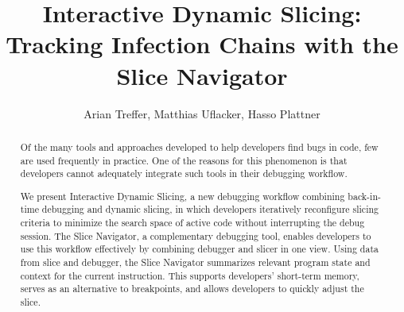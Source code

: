 \documentclass[
			english,
			review,
			]{elsarticle}
\begin{document}
\begin{frontmatter}

\title{Interactive Dynamic Slicing: Tracking Infection Chains with the Slice Navigator}

\author{Arian Treffer, Matthias Uflacker, Hasso Plattner}
\address{Hasso Plattner Institute, Potsdam, Germany}


\begin{abstract}
%
%
Of the many tools and approaches developed to help developers find bugs in code, few are used frequently in practice.
One of the reasons for this phenomenon is that developers cannot adequately integrate such tools in their debugging workflow.

We present Interactive Dynamic Slicing, a new debugging workflow combining back-in-time debugging and dynamic slicing, in which developers iteratively reconfigure slicing criteria to minimize the search space of active code without interrupting the debug session.
The Slice Navigator, a complementary debugging tool, enables developers to use this workflow effectively by combining debugger and slicer in one view.
Using data from slice and debugger, the Slice Navigator summarizes relevant program state and context for the current instruction.
This supports developers’ short-term memory, serves as an alternative to breakpoints, and allows developers to quickly adjust the slice.


\end{abstract}
\end{frontmatter}
\end{document}
